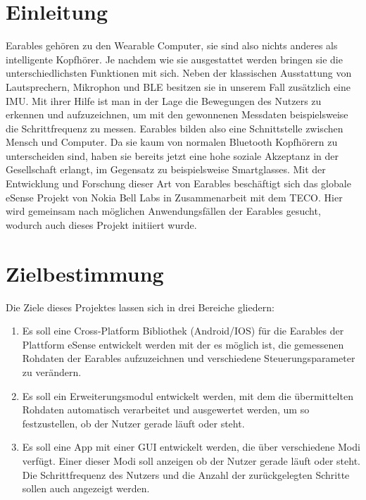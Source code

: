 \documentclass[a4paper,12pt]{article}
\title{\projektName}
\date{\today}
\begin{document}
 \setcounter{page}{2}
 \tableofcontents          %
 \clearpage

\section{Einleitung}
\Gls{Earables} gehören zu den \Gls{Wearable Computer}, sie sind also nichts anderes als intelligente Kopfhörer. Je nachdem wie sie ausgestattet werden bringen sie die unterschiedlichsten Funktionen mit sich. Neben der klassischen Ausstattung von Lautsprechern, Mikrophon und \gls{BLE} besitzen sie in unserem Fall zusätzlich eine \Gls{IMU}. Mit ihrer Hilfe ist man in der Lage die Bewegungen des Nutzers zu erkennen und aufzuzeichnen, um mit den gewonnenen Messdaten  beispielsweise die \Gls{Schrittfrequenz} zu messen.  \Gls{Earables} bilden also eine Schnittstelle zwischen Mensch und Computer. Da sie kaum von normalen Bluetooth Kopfhörern zu unterscheiden sind, haben sie bereits jetzt eine hohe soziale Akzeptanz in der Gesellschaft erlangt, im Gegensatz zu beispielsweise Smartglasses. Mit der Entwicklung und Forschung dieser Art von \Gls{Earables} beschäftigt sich das globale eSense Projekt von Nokia Bell Labs in Zusammenarbeit mit dem TECO. Hier wird gemeinsam nach möglichen Anwendungsfällen der \Gls{Earables} gesucht, wodurch auch dieses Projekt initiiert wurde.
\section{Zielbestimmung}
Die Ziele dieses Projektes lassen sich in drei Bereiche gliedern:
\begin{enumerate}

  \item Es soll eine \Gls{Cross-Platform Bibliothek} (Android/IOS) für die \Gls{Earables} der Plattform eSense entwickelt werden mit der es möglich ist, die gemessenen Rohdaten der \Gls{Earables} aufzuzeichnen und verschiedene \Gls{Steuerungsparameter} zu verändern.
  
  \item Es soll ein Erweiterungsmodul entwickelt werden, mit dem die übermittelten  \Gls{Rohdaten} automatisch verarbeitet und ausgewertet werden, um so festzustellen, ob der Nutzer gerade läuft oder steht.
  
  \item Es soll eine App mit einer \Gls{GUI} entwickelt werden, die über verschiedene Modi verfügt. Einer dieser Modi soll anzeigen ob der Nutzer gerade läuft oder steht. Die \gls{Schrittfrequenz} des Nutzers und die Anzahl der zurückgelegten Schritte sollen auch angezeigt werden.

\end{enumerate}
\end{document}
